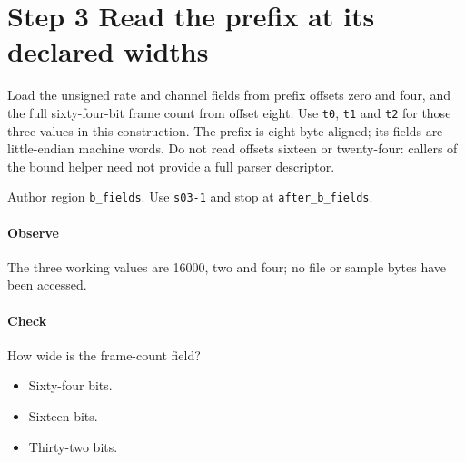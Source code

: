 \section{Step 3 Read the prefix at its declared widths}\label{pcm-wav-s03}
Load the unsigned rate and channel fields from prefix offsets zero and four, and the full sixty-four-bit frame count from offset eight. Use \texttt{t0}, \texttt{t1} and \texttt{t2} for those three values in this construction. The prefix is eight-byte aligned; its fields are little-endian machine words. Do not read offsets sixteen or twenty-four: callers of the bound helper need not provide a full parser descriptor.

Author region \texttt{b\_fields}. Use \texttt{s03-1} and stop at \texttt{after\_b\_fields}.

\paragraph{Observe} The three working values are 16000, two and four; no file or sample bytes have been accessed.

\paragraph{Check} How wide is the frame-count field?
\begin{itemize}
  \item[A.] Sixty-four bits.
  \item[B.] Sixteen bits.
  \item[C.] Thirty-two bits.
\end{itemize}
